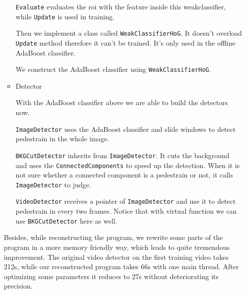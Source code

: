 \documentclass[a4paper]{article}
\begin{document}
\begin{enumerate}
\begin{itemize}
\lstinline{Evaluate} evaluates the roi with the feature inside this weakclassifier, while \lstinline{Update} is used in training.

Then we implement a class called \lstinline{WeakClassifierHoG}. It doesn't overload \lstinline{Update} method therefore it can't be trained. It's only used in the offline AdaBoost classifier.

We construct the AdaBoost classifier using \lstinline{WeakClassifierHoG}.

\item Detector

With the AdaBoost classifier above we are able to build the detectors now.

\lstinline{ImageDetector} uses the AdaBoost classifier and slide windows to detect pedestrain in the whole image.

\lstinline{BKGCutDetector} inherits from \lstinline{ImageDetector}. It cuts the background and uses the \lstinline{ConnectedComponents} to speed up the detection. When it is not sure whether a connected component is a pedestrain or not, it calls \lstinline{ImageDetector} to judge.

\lstinline{VideoDetector} receives a pointer of \lstinline{ImageDetector} and use it to detect pedestrain in every two frames. Notice that with virtual function we can use \lstinline{BKGCutDetector} here as well.

\end{itemize}

Besides, while reconstructing the program, we rewrite some parts of the program in a more memory friendly way, which leads to quite tremendous improvement. The original video detector on the first training video takes 212s, while our reconstructed program takes 66s with one main thread. After optimizing some parameters it reduces to 27s without deteriorating its precision.


\end{enumerate}
\end{document}
